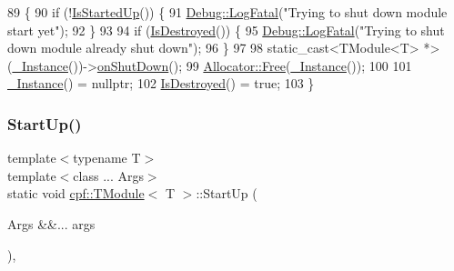 \begin{DoxyCode}
89                                \{
90             \textcolor{keywordflow}{if} (!\hyperlink{classcpf_1_1_t_module_a73732afee7131dad652bf3e00c75cef9}{IsStartedUp}()) \{
91                 \hyperlink{classcpf_1_1_debug_a22849847c74bcb444922c263c9ae6183}{Debug::LogFatal}(\textcolor{stringliteral}{"Trying to shut down module start yet"});
92             \}
93 
94             \textcolor{keywordflow}{if} (\hyperlink{classcpf_1_1_t_module_a9f70f0a70ac59b13b7a874f82c877337}{IsDestroyed}()) \{
95                 \hyperlink{classcpf_1_1_debug_a22849847c74bcb444922c263c9ae6183}{Debug::LogFatal}(\textcolor{stringliteral}{"Trying to shut down module already shut down"});
96             \}
97 
98             \textcolor{keyword}{static\_cast<}TModule<T> *\textcolor{keyword}{>}(\hyperlink{classcpf_1_1_t_module_a06ab8af8ea6b294959937fd2bbc1e615}{\_Instance}())->\hyperlink{classcpf_1_1_t_module_a15c93b1aca54022e145961bea8e3ea7d}{onShutDown}();
99             \hyperlink{classcpf_1_1_allocator_af63eadbfa53045d7eede980fd5d15eb4}{Allocator::Free}(\hyperlink{classcpf_1_1_t_module_a06ab8af8ea6b294959937fd2bbc1e615}{\_Instance}());
100 
101             \hyperlink{classcpf_1_1_t_module_a06ab8af8ea6b294959937fd2bbc1e615}{\_Instance}() = \textcolor{keyword}{nullptr};
102             \hyperlink{classcpf_1_1_t_module_a9f70f0a70ac59b13b7a874f82c877337}{IsDestroyed}() = \textcolor{keyword}{true};
103         \}
\end{DoxyCode}
\mbox{\label{classcpf_1_1_t_module_a02fbf3c4d28a3328e81b0e8d0bdd93b0}} 
\subsubsection{\texorpdfstring{Start\+Up()}{StartUp()}\hspace{0.1cm}{\footnotesize\ttfamily [1/2]}}
{\footnotesize\ttfamily template$<$typename T$>$ \\
template$<$class ... Args$>$ \\
static void \hyperlink{classcpf_1_1_t_module}{cpf\+::\+T\+Module}$<$ T $>$\+::Start\+Up (\begin{DoxyParamCaption}\item[{Args \&\&...}]{args }\end{DoxyParamCaption})\hspace{0.3cm}{\ttfamily [inline]}, {\ttfamily [static]}}

